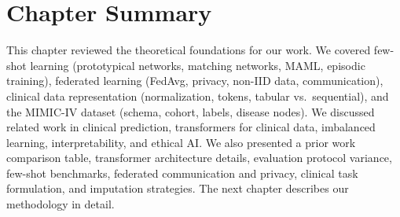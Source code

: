 \section{Chapter Summary}

This chapter reviewed the theoretical foundations for our work. We covered few-shot learning (prototypical networks, matching networks, MAML, episodic training), federated learning (FedAvg, privacy, non-IID data, communication), clinical data representation (normalization, tokens, tabular vs.\ sequential), and the MIMIC-IV dataset (schema, cohort, labels, disease nodes). We discussed related work in clinical prediction, transformers for clinical data, imbalanced learning, interpretability, and ethical AI. We also presented a prior work comparison table, transformer architecture details, evaluation protocol variance, few-shot benchmarks, federated communication and privacy, clinical task formulation, and imputation strategies. The next chapter describes our methodology in detail.
